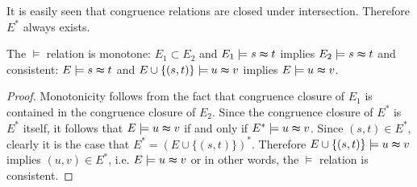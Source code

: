 It is easily seen that congruence relations are closed under intersection.
Therefore $E^*$ always exists.

\begin{proposition}
\label{prop:models}
The $\models$ relation is monotone: $E_1 \subset E_2$ and $E_1 \models s \thickapprox t$ implies $E_2 \models s \thickapprox t$ and consistent: $E \models s \thickapprox t$ and $E \cup \{(s,t)\} \models u \thickapprox v$ implies $E \models u \thickapprox v$. 

\end{proposition}

\begin{proof}

Monotonicity follows from the fact that congruence closure of $E_1$ is contained in the congruence closure of $E_2$.
Since the congruence closure of $E^*$ is $E^*$ itself, it follows that $E \models u \thickapprox v$ if and only if $E^* \models u \thickapprox v$.
Since $(s,t) \in E^*$, clearly it is the case that $E^* = (E \cup \{(s,t)\})^*$.
Therefore $E \cup \{(s,t)\} \models u \thickapprox v$ implies $(u,v) \in E^*$, i.e. $E \models u \thickapprox v$ or in other words, the $\models$ relation is consistent.

\end{proof}

